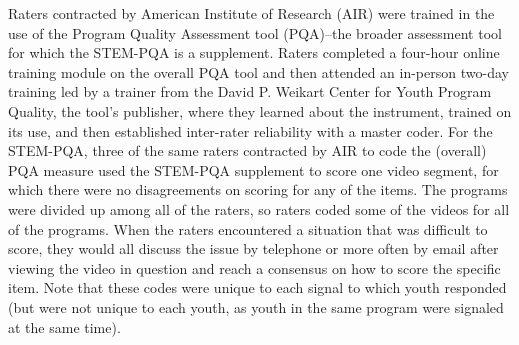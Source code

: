 \documentclass[]{book}
\theoremstyle{definition}
\theoremstyle{definition}
\theoremstyle{definition}
\theoremstyle{remark}
\begin{document}
Raters contracted by American Institute of Research (AIR) were trained
in the use of the Program Quality Assessment tool (PQA)--the broader
assessment tool for which the STEM-PQA is a supplement. Raters completed
a four-hour online training module on the overall PQA tool and then
attended an in-person two-day training led by a trainer from the David
P. Weikart Center for Youth Program Quality, the tool's publisher, where
they learned about the instrument, trained on its use, and then
established inter-rater reliability with a master coder. For the
STEM-PQA, three of the same raters contracted by AIR to code the
(overall) PQA measure used the STEM-PQA supplement to score one video
segment, for which there were no disagreements on scoring for any of the
items. The programs were divided up among all of the raters, so raters
coded some of the videos for all of the programs. When the raters
encountered a situation that was difficult to score, they would all
discuss the issue by telephone or more often by email after viewing the
video in question and reach a consensus on how to score the specific
item. Note that these codes were unique to each signal to which youth
responded (but were not unique to each youth, as youth in the same
program were signaled at the same time).

\begin{table}

\caption{\label{tab:unnamed-chunk-6}Coding Frame for Work With Data}
\centering
{}
\end{table}
\end{document}
